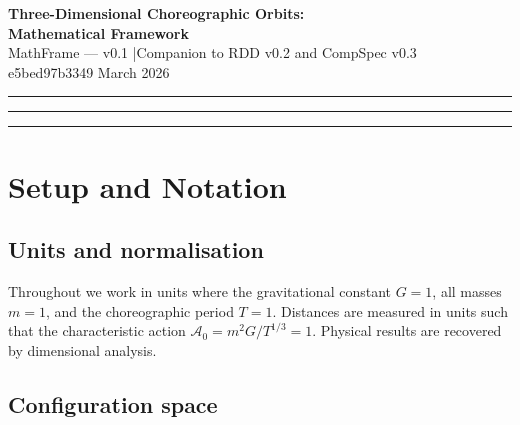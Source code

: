 \documentclass[12pt, a4paper]{article}
\theoremstyle{plain}
\theoremstyle{definition}
\newcommand{\Action}{\mathcal{A}}
\begin{document}
\begin{center}
  {\LARGE \textbf{Three-Dimensional Choreographic Orbits:\\[4pt]
  Mathematical Framework}}\\[1.6em]
  {\large \textcolor{muted}{MathFrame — v0.1
    \quad|\quad Companion to RDD v0.2 and CompSpec v0.3}}\\[0.6em]
  {\normalsize \textcolor{muted}{e5bed97b3349 \quad\textbullet\quad March 2026}}
\end{center}

\vspace{1em}
\noindent\rule{\textwidth}{0.4pt}

\begin{abstract}
\noindent
This document develops the mathematical foundations underlying the
three-dimensional choreographic orbit classification programme.  We
establish the variational framework, derive the Fourier-mode constraints
imposed by each relevant three-dimensional point group via representation
theory, state the symmetric-criticality existence theorem, develop the
knot-theoretic characterisation of the spacetime trace, and present the
Floquet--Krein stability theory for periodic Hamiltonian orbits.  These
results inform the research design and computational specification;
they will also constitute the theory section of the eventual paper.
\end{abstract}

\noindent\rule{\textwidth}{0.4pt}
\tableofcontents
\noindent\rule{\textwidth}{0.4pt}

\section{Setup and Notation}

\subsection{Units and normalisation}

Throughout we work in units where the gravitational constant $G = 1$,
all masses $m = 1$, and the choreographic period $T = 1$.  Distances
are measured in units such that the characteristic action
$\Action_0 = m^2 G / T^{1/3} = 1$.  Physical results are recovered
by dimensional analysis.

\subsection{Configuration space}
\end{document}
